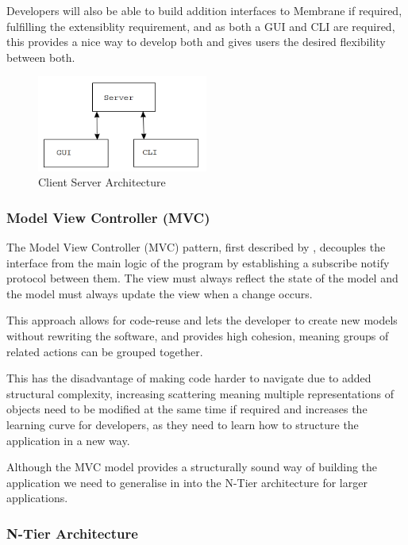 \documentclass[11pt, a4paper, twocolumn, twoside]{report}
\begin{document}
Developers will also be able to build addition interfaces to Membrane if required, fulfilling the extensiblity requirement, and as both a GUI and CLI are required, this provides a nice way to develop both and gives users the desired flexibility between both.

\begin{figure}[t]
 \centering
 \includegraphics[width=0.5\textwidth]{client-server-model}
 \caption{Client Server Architecture}
 \label{fig:client-server}
\end{figure}

\subsubsection{Model View Controller (MVC)}

The Model View Controller (MVC) pattern, first described by \cite{krasner1988cookbook}, decouples the interface from the main logic of the program by establishing a subscribe notify protocol between them. The view must always reflect the state of the model and the model must always update the view when a change occurs.

This approach allows for code-reuse and lets the developer to create new models without rewriting the software, and provides high cohesion, meaning groups of related actions can be grouped together.

This has the disadvantage of making code harder to navigate due to added structural complexity, increasing scattering meaning multiple representations of objects need to be modified at the same time if required and increases the learning curve for developers, as they need to learn how to structure the application in a new way.

Although the MVC model provides a structurally sound way of building the application we need to generalise in into the N-Tier architecture for larger applications.

\subsubsection{N-Tier Architecture}
\end{document}

